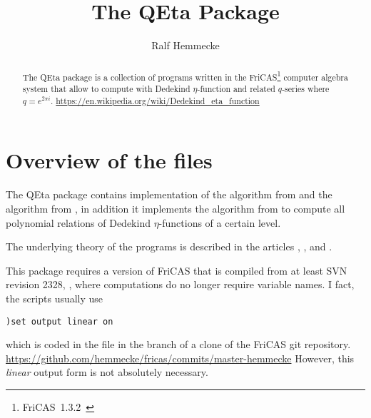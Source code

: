 \documentclass{article}
\begin{document}
\title{The QEta Package}
\author{Ralf Hemmecke}
\maketitle
\begin{abstract}
  The QEta package is a collection of programs written in the
  FriCAS\footnote{FriCAS~1.3.2~\cite{FriCAS}} computer algebra system
  that allow to compute with Dedekind $\eta$-function and related
  $q$-series where $q=e^{2\pi i}$.
  \url{https://en.wikipedia.org/wiki/Dedekind_eta_function}
\end{abstract}

\section*{Overview of the files}

The QEta package contains implementation of the  algorithm
from \cite{Radu:RamanujanKolberg:2015} and the \algoSamba{} algorithm
from \cite{Hemmecke:DancingSambaRamanujan:2018}, in addition it
implements the algorithm from \cite{Hemmecke+Radu:EtaRelations:2018}
to compute all polynomial relations of Dedekind $\eta$-functions of a
certain level.

The underlying theory of the programs is described in the articles
\cite{Radu:RamanujanKolberg:2015},
\cite{Hemmecke:DancingSambaRamanujan:2018}, and
\cite{Hemmecke+Radu:EtaRelations:2018}.

This package requires a version of FriCAS that is compiled from at
least SVN revision 2328, \ie, where \GB{} computations do no longer
require variable names. I fact, the scripts usually use
\begin{verbatim}
)set output linear on
\end{verbatim}
which is coded in the file  in the
 branch of a clone of the FriCAS git repository.
\url{https://github.com/hemmecke/fricas/commits/master-hemmecke}
However, this \emph{linear} output form is not absolutely necessary.
\end{document}
